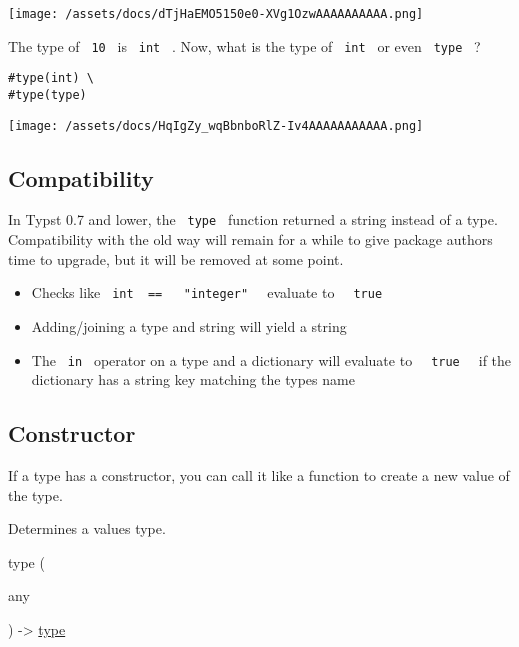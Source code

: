 \texttt{[image: /assets/docs/dTjHaEMO5150e0-XVg1OzwAAAAAAAAAA.png]}

The type of \texttt{\ 10\ } is \texttt{\ int\ } . Now, what is the type
of \texttt{\ int\ } or even \texttt{\ type\ } ?

\begin{verbatim}
#type(int) \
#type(type)
\end{verbatim}

\texttt{[image: /assets/docs/HqIgZy\_wqBbnboRlZ-Iv4AAAAAAAAAAA.png]}

\subsection{Compatibility}\label{compatibility}

In Typst 0.7 and lower, the \texttt{\ type\ } function returned a string
instead of a type. Compatibility with the old way will remain for a
while to give package authors time to upgrade, but it will be removed at
some point.

\begin{itemize}
\tightlist
\item
  Checks like
  \texttt{\ int\ }{\texttt{\ ==\ }}\texttt{\ }{\texttt{\ "integer"\ }}\texttt{\ }
  evaluate to \texttt{\ }{\texttt{\ true\ }}\texttt{\ }
\item
  Adding/joining a type and string will yield a string
\item
  The \texttt{\ in\ } operator on a type and a dictionary will evaluate
  to \texttt{\ }{\texttt{\ true\ }}\texttt{\ } if the dictionary has a
  string key matching the type\textquotesingle s name
\end{itemize}

\subsection{\texorpdfstring{Constructor
{}}{Constructor }}\label{constructor}

\label{constructor-constructor-tooltip}
If a type has a constructor, you can call it like a function to create a
new value of the type.

Determines a value\textquotesingle s type.

{ type } (

{ { any } }

) -\textgreater{} \href{/docs/reference/foundations/type/}{type}

